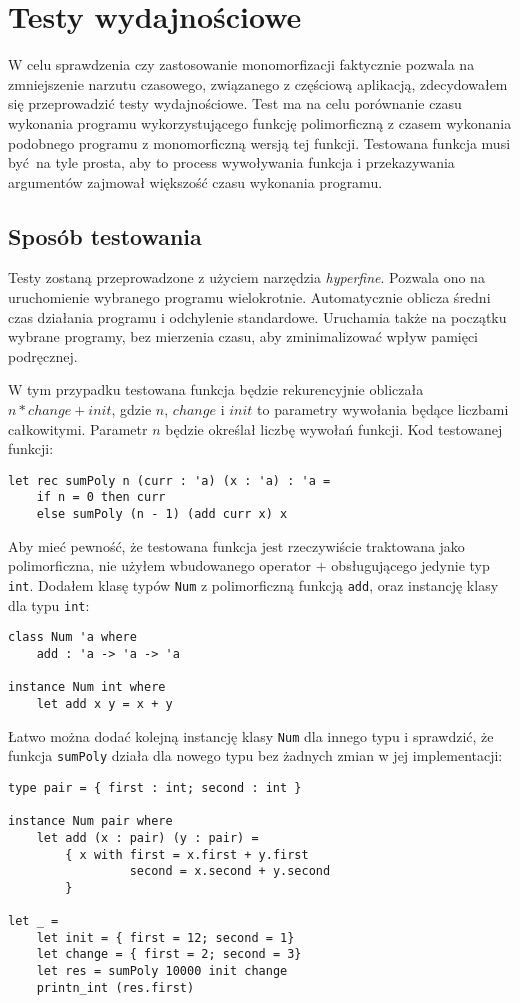\documentclass[declaration,shortabstract]{iithesis}
\begin{document}


\chapter{Testy wydajnościowe}

W celu sprawdzenia czy zastosowanie monomorfizacji faktycznie pozwala na 
zmniejszenie narzutu czasowego, związanego z częściową aplikacją, zdecydowałem 
się przeprowadzić testy wydajnościowe. Test ma na celu porównanie czasu wykonania 
programu wykorzystującego funkcję polimorficzną z czasem wykonania 
podobnego programu z monomorficzną wersją tej funkcji. Testowana funkcja musi 
być na tyle prosta, aby to process wywoływania funkcja i przekazywania 
argumentów zajmował większość czasu wykonania programu. 

\section{Sposób testowania}
Testy zostaną przeprowadzone z użyciem narzędzia \textit{hyperfine}\cite{hyperfine}. 
Pozwala ono na uruchomienie wybranego programu wielokrotnie. 
Automatycznie oblicza średni czas działania programu i odchylenie standardowe.
Uruchamia także na początku wybrane programy, bez mierzenia czasu, aby zminimalizować 
wpływ pamięci podręcznej.

W tym przypadku testowana 
funkcja będzie rekurencyjnie obliczała $n * change + init$, gdzie $n$, $change$ i $init$ 
to parametry wywołania będące liczbami całkowitymi. Parametr $n$ będzie określał 
liczbę wywołań funkcji. Kod testowanej funkcji:
\begin{lstlisting}[frame=lines]
let rec sumPoly n (curr : 'a) (x : 'a) : 'a = 
    if n = 0 then curr 
    else sumPoly (n - 1) (add curr x) x 
\end{lstlisting}
Aby mieć pewność, że testowana funkcja jest rzeczywiście traktowana jako 
polimorficzna, nie użyłem wbudowanego operator $+$ obsługującego jedynie typ 
\texttt{int}. Dodałem klasę typów \texttt{Num} z polimorficzną funkcją 
\texttt{add}, oraz instancję klasy dla typu \texttt{int}:
\begin{lstlisting}[frame=lines]
class Num 'a where 
    add : 'a -> 'a -> 'a 

instance Num int where 
    let add x y = x + y 
\end{lstlisting}
Łatwo można dodać kolejną instancję klasy \texttt{Num} dla innego typu i sprawdzić, 
że funkcja \texttt{sumPoly} działa dla nowego typu bez żadnych zmian w jej 
implementacji:
\begin{lstlisting}[frame=lines]
type pair = { first : int; second : int }

instance Num pair where 
    let add (x : pair) (y : pair) = 
        { x with first = x.first + y.first
                 second = x.second + y.second
        }

let _ = 
    let init = { first = 12; second = 1}
    let change = { first = 2; second = 3} 
    let res = sumPoly 10000 init change 
    printn_int (res.first) 
\end{lstlisting}
\end{document}
